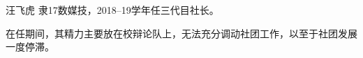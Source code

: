 \begin{section}{汪飞虎}
	\label{person:汪飞虎}
	隶17数媒技，2018--19学年任三代目社长。
	
	在任期间，其精力主要放在校辩论队上，无法充分调动社团工作，以至于社团发展一度停滞。
\end{section}